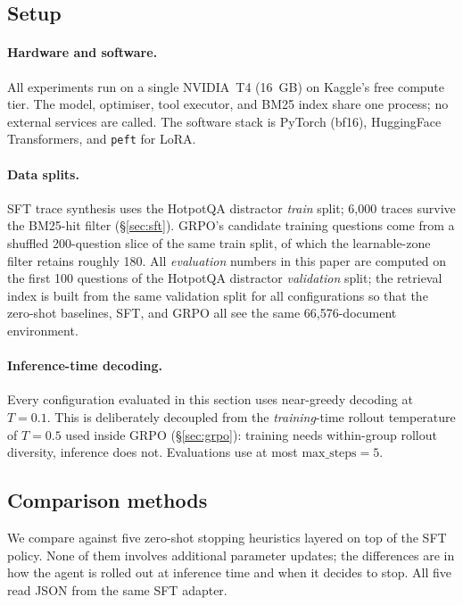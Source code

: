\documentclass[11pt]{article}
\begin{document}
\subsection{Setup}
\label{sec:setup}

\paragraph{Hardware and software.}
All experiments run on a single NVIDIA~T4 (16~GB) on Kaggle's free
compute tier. The model, optimiser, tool executor, and BM25 index share
one process; no external services are called. The software stack is
PyTorch (bf16), HuggingFace Transformers, and \texttt{peft} for LoRA.

\paragraph{Data splits.}
SFT trace synthesis uses the HotpotQA distractor \emph{train} split;
6{,}000 traces survive the BM25-hit filter (§\ref{sec:sft}). GRPO's
candidate training questions come from a shuffled 200-question slice
of the same train split, of which the learnable-zone filter retains
roughly 180. All \emph{evaluation} numbers in this paper are computed
on the first 100 questions of the HotpotQA distractor
\emph{validation} split; the retrieval index is built from the same
validation split for all configurations so that the zero-shot
baselines, SFT, and GRPO all see the same 66{,}576-document
environment.

\paragraph{Inference-time decoding.}
Every configuration evaluated in this section uses near-greedy
decoding at $T=0.1$. This is deliberately decoupled from the
\emph{training}-time rollout temperature of $T=0.5$ used inside
GRPO (§\ref{sec:grpo}): training needs within-group rollout
diversity, inference does not. Evaluations use at most
$\text{max\_steps} = 5$.

\subsection{Comparison methods}
\label{sec:comparison-methods}

We compare against five zero-shot stopping heuristics layered on top
of the SFT policy. None of them involves additional parameter updates;
the differences are in how the agent is rolled out at inference time
and when it decides to stop. All five read JSON from the same SFT
adapter.
\end{document}
